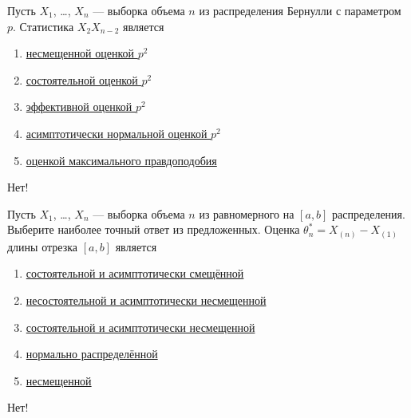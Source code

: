 \documentclass[t]{beamer}
\begin{document}
 \begin{frame} \label{37-No} 
\begin{block}{37} 

Пусть $X_1$, \ldots, $X_n$ — выборка объема $n$ из распределения Бернулли с параметром $p$. Статистика $X_2 X_{n-2}$ является
 


 \end{block} 
\begin{enumerate} 
\item[] \hyperlink{37-Yes}{\beamergotobutton{} несмещенной оценкой $p^2$}
\item[] \hyperlink{37-No}{\beamergotobutton{} состоятельной оценкой $p^2$}
\item[] \hyperlink{37-No}{\beamergotobutton{} эффективной оценкой $p^2$}
\item[] \hyperlink{37-No}{\beamergotobutton{} асимптотически нормальной оценкой $p^2$}
\item[] \hyperlink{37-No}{\beamergotobutton{} оценкой максимального правдоподобия}
\end{enumerate} 

 \alert{Нет!} 
\end{frame} 


 \begin{frame} \label{38-No} 
\begin{block}{38} 

Пусть $X_1$, \ldots, $X_n$ — выборка объема $n$ из равномерного на $[a, b]$ распределения. Выберите наиболее точный ответ из предложенных. Оценка $\theta^*_n = X_{(n)}-X_{(1)}$ длины отрезка $[a,b]$ является
 


 \end{block} 
\begin{enumerate} 
\item[] \hyperlink{38-No}{\beamergotobutton{} состоятельной и асимптотически смещённой}
\item[] \hyperlink{38-No}{\beamergotobutton{} несостоятельной и асимптотически несмещенной}
\item[] \hyperlink{38-Yes}{\beamergotobutton{} состоятельной и асимптотически несмещенной}
\item[] \hyperlink{38-No}{\beamergotobutton{} нормально распределённой}
\item[] \hyperlink{38-No}{\beamergotobutton{} несмещенной}
\end{enumerate} 

 \alert{Нет!} 
\end{frame} 
\end{document}
